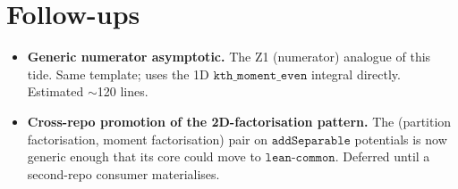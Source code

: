 \documentclass[11pt]{article}
\begin{document}
\section{Follow-ups}

\begin{itemize}[leftmargin=*]
\item \textbf{Generic numerator asymptotic.} The Z1 (numerator)
      analogue of this tide. Same template; uses the 1D
      $\texttt{kth\_moment\_even}$ integral directly. Estimated
      $\sim$120 lines.
\item \textbf{Cross-repo promotion of the 2D-factorisation pattern.}
      The (partition factorisation, moment factorisation) pair on
      $\texttt{addSeparable}$ potentials is now generic enough that
      its core could move to $\texttt{lean-common}$. Deferred until
      a second-repo consumer materialises.
\end{itemize}
\end{document}
